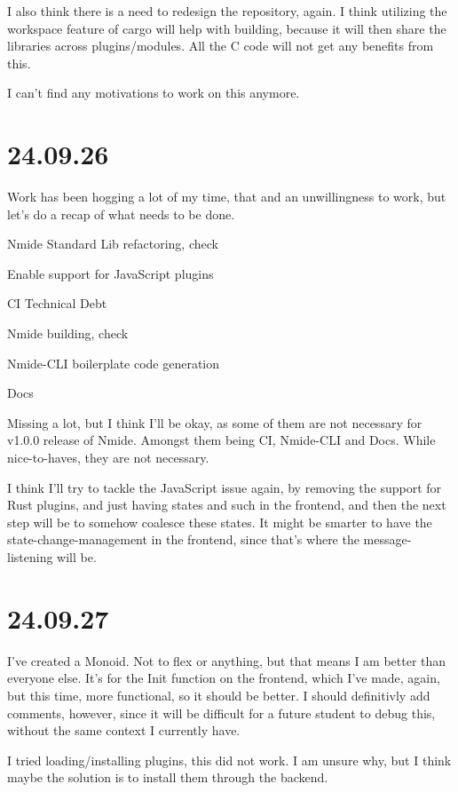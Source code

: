 I also think there is a need to redesign the repository, again. I think utilizing the workspace feature of
cargo will help with building, because it will then share the libraries across plugins/modules. All the C
code will not get any benefits from this.

I can't find any motivations to work on this anymore.


\section{24.09.26}

Work has been hogging a lot of my time, that and an unwillingness to work, but let's do a recap of what needs to be
done.

\begin{list}
  \item Nmide Standard Lib refactoring, check
  \item Enable support for JavaScript plugins
  \item CI Technical Debt
  \item Nmide building, check
  \item Nmide-CLI boilerplate code generation
  \item Docs
\end{list}

Missing a lot, but I think I'll be okay, as some of them are not necessary for v1.0.0 release of Nmide. Amongst them being CI,
Nmide-CLI and Docs. While nice-to-haves, they are not necessary.

I think I'll try to tackle the JavaScript issue again, by removing the support for Rust plugins, and just having states and such in
the frontend, and then the next step will be to somehow coalesce these states. It might be smarter to have the state-change-management in
the frontend, since that's where the message-listening will be.


\section{24.09.27}

I've created a Monoid. Not to flex or anything, but that means I am better than everyone else. It's for the Init function on the frontend,
which I've made, again, but this time, more functional, so it should be better. I should definitivly add comments, however, since it will
be difficult for a future student to debug this, without the same context I currently have.

I tried loading/installing plugins, this did not work. I am unsure why, but I think maybe the solution is to install them through the
backend.
